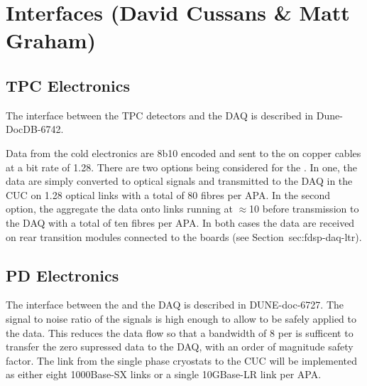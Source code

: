 
\section{Interfaces (David Cussans \& Matt Graham)}
\label{sec:fdsp-daq-intfc}



\subsection{TPC Electronics}
\label{sec:fdsp-daq-intfc-elec}

The interface between the  TPC detectors and the DAQ is described in Dune-DocDB-6742.

Data from the cold electronics  are 8b10 encoded and sent
to the  on copper cables at a bit rate of
\SI{1.28}{\Gbps}. There are two options being considered for the
. In one, the data are simply converted to optical signals
and transmitted to the DAQ in the CUC on \SI{1.28}{\Gbps} optical
links with a total of 80 fibres per APA. In the second option, the
 aggregate the data onto links running at
$\approx$\SI{10}{\Gbps} before transmission to the DAQ with a total of
ten fibres per APA. In both cases the data are received on rear
transition modules connected to the   boards
(see Section~{sec:fdsp-daq-ltr}).



\subsection{PD Electronics}
\label{sec:fdsp-daq-intfc-photon}

The interface between the  
and the DAQ is described in DUNE-doc-6727. The signal to noise ratio
of the  signals is high enough to allow  to be safely applied to the data. This reduces the data flow so that a bandwidth of
\SI{8}{\Gbps} per  is sufficent to transfer the zero supressed data to
the DAQ, with an order of magnitude safety factor. The link from the
single phase cryostats to the CUC will be implemented as either eight
1000Base-SX links  or a single 10GBase-LR link per APA.

